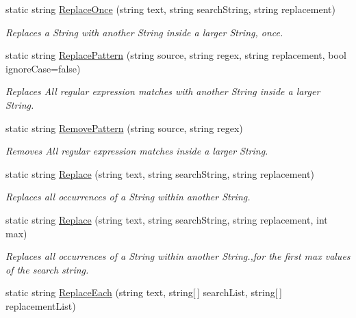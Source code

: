 \begin{DoxyCompactItemize}
static string \hyperlink{class_ultimate_1_1_utilities_1_1_string_utils_ac520610ac021d64c1c6ec80805e325c3}{Replace\+Once} (string text, string search\+String, string replacement)
\begin{DoxyCompactList}\small\item\em Replaces a String with another String inside a larger String, once. \end{DoxyCompactList}\item 
static string \hyperlink{class_ultimate_1_1_utilities_1_1_string_utils_a2c56fd21d53cd911453af7102e4bd897}{Replace\+Pattern} (string source, string regex, string replacement, bool ignore\+Case=false)
\begin{DoxyCompactList}\small\item\em Replaces All regular expression matches with another String inside a larger String. \end{DoxyCompactList}\item 
static string \hyperlink{class_ultimate_1_1_utilities_1_1_string_utils_a86757d0adc89e2eaeac9689eb0a43859}{Remove\+Pattern} (string source, string regex)
\begin{DoxyCompactList}\small\item\em Removes All regular expression matches inside a larger String. \end{DoxyCompactList}\item 
static string \hyperlink{class_ultimate_1_1_utilities_1_1_string_utils_ad0d61b4c80159b2e6e367a37ab3e8af9}{Replace} (string text, string search\+String, string replacement)
\begin{DoxyCompactList}\small\item\em Replaces all occurrences of a String within another String. \end{DoxyCompactList}\item 
static string \hyperlink{class_ultimate_1_1_utilities_1_1_string_utils_a77074a67455e41471906d43c2ed191b3}{Replace} (string text, string search\+String, string replacement, int max)
\begin{DoxyCompactList}\small\item\em Replaces all occurrences of a String within another String.,for the first max values of the search string. \end{DoxyCompactList}\item 
static string \hyperlink{class_ultimate_1_1_utilities_1_1_string_utils_a2cda2fea40bacaee6774eeff558dfe94}{Replace\+Each} (string text, string\mbox{[}$\,$\mbox{]} search\+List, string\mbox{[}$\,$\mbox{]} replacement\+List)

\end{DoxyCompactItemize}
